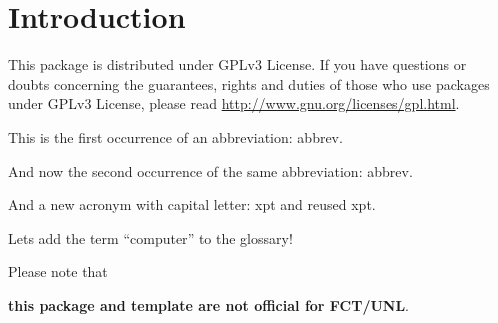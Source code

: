 % 
%  
%
\chapter{Introduction}
\label{cha:introduction}

This package is distributed under GPLv3 License. If you have questions or  doubts concerning the guarantees, rights and duties of those who use packages under GPLv3 License, please read \url{http://www.gnu.org/licenses/gpl.html}.


This is the first occurrence of an abbreviation: \gls{abbrev}.

And now the second occurrence of the same abbreviation: \gls{abbrev}.

And a new acronym with capital letter: \Gls{xpt} and reused \gls{xpt}.

Lets add the term ``\gls{computer}'' to the glossary!

Please note that 
\begin{center}
	\textbf{\large this package and template are not official for FCT/UNL}.
\end{center}
